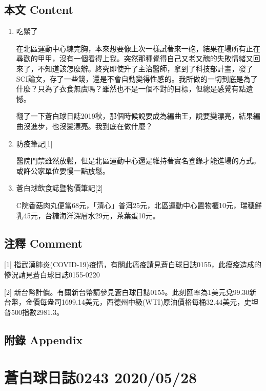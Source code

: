 \documentclass[a5paper, 12pt
]{book}
\begin{document}
\hypertarget{ux672cux6587-content-87}{%
\subsection{本文 Content}\label{ux672cux6587-content-87}}

\begin{enumerate}
\def\labelenumi{\arabic{enumi}.}
\item
  吃鱉了

  在北區運動中心練完胸，本來想要像上次一樣試著來一砲，結果在場所有正在尋歡的甲甲，沒有一個看得上我。突然那種覺得自己又老又醜的失敗情緒又回來了，不知道該怎麼辦。終究即使升了主治醫師，拿到了科技部計畫，發了SCI論文，存了一些錢，還是不會自動變得性感的。我所做的一切到底是為了什麼？只為了衣食無虞嗎？雖然也不是一個不對的目標，但總是感覺有點遺憾。

  翻了一下蒼白球日誌2019秋，那個時候說要成為編曲王，說要變漂亮，結果編曲沒進步，也沒變漂亮。我到底在做什麼？
\item
  防疫筆記{[}1{]}

  醫院門禁雖然放鬆，但是北區運動中心還是維持著實名登錄才能進場的方式。或許公家單位要慢一點放鬆。
\item
  蒼白球飲食誌暨物價筆記{[}2{]}

  C院香菇肉丸便當68元，「清心」普洱25元，北區運動中心置物櫃10元，瑞穗鮮乳45元，台糖海洋深層水29元，茶葉蛋10元。
\end{enumerate}

\hypertarget{ux6ce8ux91cb-comment-87}{%
\subsection{注釋 Comment}\label{ux6ce8ux91cb-comment-87}}

{[}1{]}
指武漢肺炎(COVID-19)疫情，有關此瘟疫請見蒼白球日誌0155，此瘟疫造成的慘況請見蒼白球日誌0155-0220

{[}2{]}
新台幣計價。有關新台幣請參見蒼白球日誌0155。此刻匯率為1美元兌99.30新台幣，金價每盎司1699.14美元，西德州中級(WTI)原油價格每桶32.44美元，史坦普500指數2981.3。

\hypertarget{ux9644ux9304-appendix-87}{%
\subsection{附錄 Appendix}\label{ux9644ux9304-appendix-87}}

\hypertarget{ux84bcux767dux7403ux65e5ux8a8c0243-20200528}{%
\section{蒼白球日誌0243
2020/05/28}\label{ux84bcux767dux7403ux65e5ux8a8c0243-20200528}}
\end{document}
